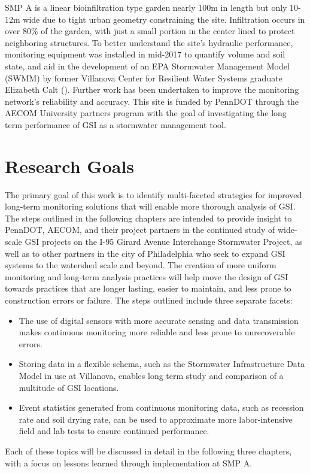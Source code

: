 SMP A is a linear bioinfiltration type garden nearly 100m in length but only 10-12m wide due to tight urban geometry constraining the site.
Infiltration occurs in over 80\% of the garden, with just a small portion in the center lined to protect neighboring structures.
To better understand the site's hydraulic performance, monitoring equipment was installed in mid-2017 to quantify volume and soil state, and aid in the development of an EPA Stormwater Management Model (SWMM) by former Villanova Center for Resilient Water Systems graduate Elizabeth Calt (\citeyear{Calt2018}).
Further work has been undertaken to improve the monitoring network's reliability and accuracy.
This site is funded by PennDOT through the AECOM University partners program with the goal of investigating the long term performance of GSI as a stormwater management tool.

\section{Research Goals}
The primary goal of this work is to identify multi-faceted strategies for improved long-term monitoring solutions that will enable more thorough analysis of GSI.
The steps outlined in the following chapters are intended to provide insight to PennDOT, AECOM, and their project partners in the continued study of wide-scale GSI projects on the I-95 Girard Avenue Interchange Stormwater Project, as well as to other partners in the city of Philadelphia who seek to expand GSI systems to the watershed scale and beyond.
The creation of more uniform monitoring and long-term analysis practices will help move the design of GSI towards practices that are longer lasting, easier to maintain, and less prone to construction errors or failure.
The steps outlined include three separate facets:
\begin{itemize}
	\item The use of digital sensors with more accurate sensing and data transmission makes continuous monitoring more reliable and less prone to unrecoverable errors.
	\item Storing data in a flexible schema, such as the Stormwater Infrastructure Data Model in use at Villanova, enables long term study and comparison of a multitude of GSI locations.
	\item Event statistics generated from continuous monitoring data, such as recession rate and soil drying rate, can be used to approximate more labor-intensive field and lab tests to ensure continued performance.
\end{itemize}
Each of these topics will be discussed in detail in the following three chapters, with a focus on lessons learned through implementation at SMP A.


